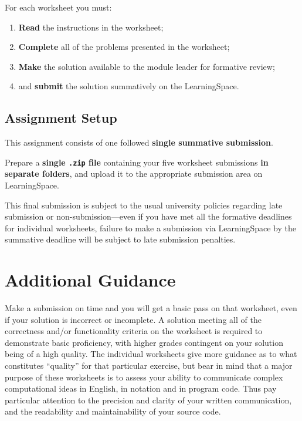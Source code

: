 \documentclass{../../../fal_assignment}
\begin{document}
	For each worksheet you must:
	
	\begin{enumerate}[label=(\roman*)]
		\item \textbf{Read} the instructions in the worksheet;
		\item \textbf{Complete} all of the problems presented in the worksheet;
		\item \textbf{Make} the solution available to the module leader for formative review;
		\item and \textbf{submit} the solution summatively on the LearningSpace.
	\end{enumerate}
	
	\subsection*{Assignment Setup}
	
	This assignment consists of one followed \textbf{single summative submission}.
	
	Prepare a \textbf{single \texttt{.zip} file} containing your five worksheet submissions \textbf{in separate folders}, and upload it to the appropriate submission area on LearningSpace.
	
	This final submission is subject to the usual university policies regarding late submission or non-submission---even if you have met all the formative deadlines for individual worksheets, failure to make a submission via LearningSpace by the summative deadline will be subject to late submission penalties.
	
	\section*{Additional Guidance}
	
	Make a submission on time and you will get a basic pass on that worksheet, even if your solution is incorrect or incomplete.
	A solution meeting all of the correctness and/or functionality criteria on the worksheet is required to demonstrate basic proficiency,
	with higher grades contingent on your solution being of a high quality.
	The individual worksheets give more guidance as to what constitutes ``quality'' for that particular exercise,
	but bear in mind that a major purpose of these worksheets is to assess your ability to communicate
	complex computational ideas in English, in notation and in program code.
	Thus pay particular attention to the precision and clarity of your written communication,
	and the readability and maintainability of your source code.
	
\end{document}
